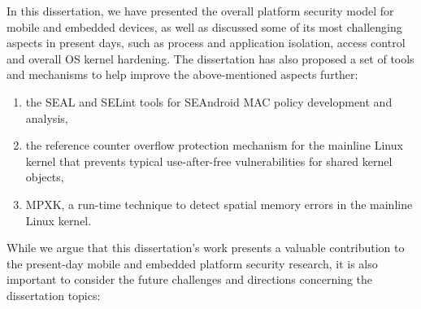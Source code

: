 
In this dissertation, we have presented the overall platform security model for mobile and embedded devices, as well as discussed some of its most challenging aspects in present days, such as process and application isolation, access control and overall OS kernel hardening.
The dissertation has also proposed a set of tools and mechanisms to help improve the above-mentioned aspects further: 
\begin{enumerate}
	\item the SEAL and SELint tools for SEAndroid MAC policy development and analysis,
	\item the reference counter overflow protection mechanism for the mainline Linux kernel that prevents typical use-after-free vulnerabilities for shared kernel objects,
	\item MPXK, a run-time technique to detect spatial memory errors in the mainline Linux kernel. 
\end{enumerate}

While we argue that this dissertation's work presents a valuable contribution to the present-day mobile and embedded platform security research, it is also important to consider the future challenges and directions concerning the dissertation topics:

